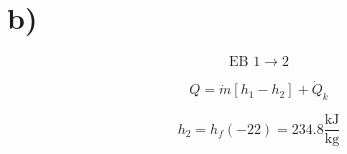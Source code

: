 

\section*{b)}

\[
\text{EB 1} \rightarrow 2
\]

\[
Q = \dot{m} \left[ h_1 - h_2 \right] + \dot{Q}_k
\]

\[
h_2 = h_f(-22) = 234.8 \frac{\text{kJ}}{\text{kg}}
\]